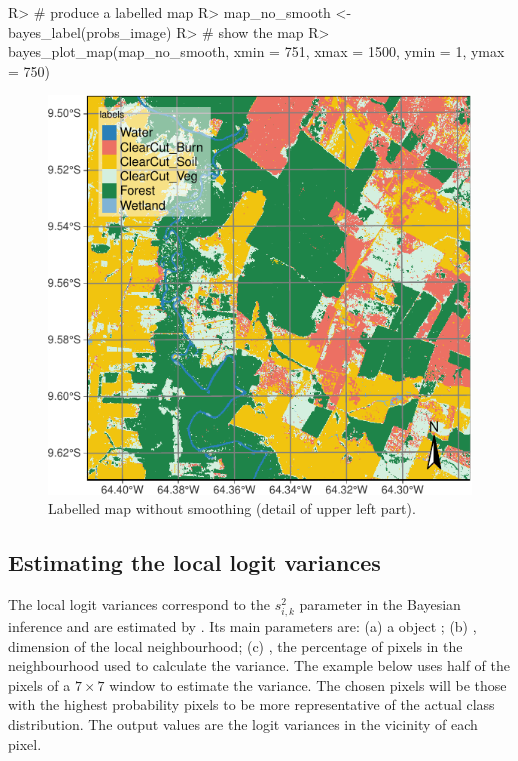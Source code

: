 \documentclass[
  shortnames]{jss}
\begin{document}
\begin{CodeChunk}
\begin{CodeInput}
R> # produce a labelled map
R> map_no_smooth <- bayes_label(probs_image)
R> # show the map
R> bayes_plot_map(map_no_smooth, xmin = 751, xmax = 1500, ymin = 1, ymax = 750)
\end{CodeInput}
\begin{figure}[h]

{\centering \includegraphics{Bayesian_smoothing_JSS_files/figure-latex/map1-1} 

}

\caption[Labelled map without smoothing (detail of upper left part)]{Labelled map without smoothing (detail of upper left part).}\label{fig:map1}
\end{figure}
\end{CodeChunk}

\hypertarget{estimating-the-local-logit-variances}{%
\subsection{Estimating the local logit variances}\label{estimating-the-local-logit-variances}}

The local logit variances correspond to the \(s^2_{i,k}\) parameter in the Bayesian inference and are estimated by . Its main parameters are: (a) a  object ; (b) , dimension of the local neighbourhood; (c) , the percentage of pixels in the neighbourhood used to calculate the variance. The example below uses half of the pixels of a \(7\times 7\) window to estimate the variance. The chosen pixels will be those with the highest probability pixels to be more representative of the actual class distribution. The output values are the logit variances in the vicinity of each pixel.
\end{document}
